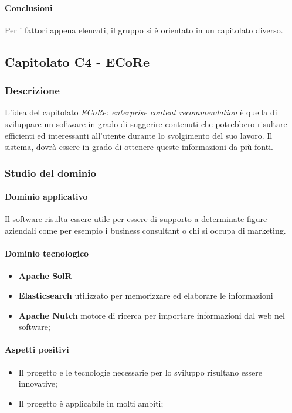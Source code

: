 	\paragraph{Conclusioni} \Spazio
	Per i fattori appena elencati, il gruppo si è orientato in un capitolato diverso.
	
	\subsection{Capitolato C4 - ECoRe}
	\subsubsection{Descrizione}
    L'idea del capitolato \emph{ECoRe: enterprise content recommendation} è quella di sviluppare un software in grado di suggerire contenuti che potrebbero risultare efficienti ed interessanti all'utente durante lo svolgimento del suo lavoro. Il sistema, dovrà essere in grado di ottenere queste informazioni da più fonti.
	
	\subsubsection{Studio del dominio} 
	\paragraph{Dominio applicativo} \Spazio
	Il software risulta essere utile per essere di supporto a determinate figure aziendali come per esempio i business consultant o chi si occupa di marketing.
	\paragraph{Dominio tecnologico}
		\begin{itemize}
		\item \textbf{Apache SolR} 
		\item \textbf{Elasticsearch} utilizzato per memorizzare ed elaborare le informazioni
		\item \textbf{Apache Nutch} motore di ricerca per importare informazioni dal web nel software;
	\end{itemize}
	
	\paragraph{Aspetti positivi} \Spazio
	\begin{itemize}
		\item Il progetto e le tecnologie necessarie per lo sviluppo risultano essere innovative;
		\item Il progetto è applicabile in molti ambiti;
	\end{itemize}
